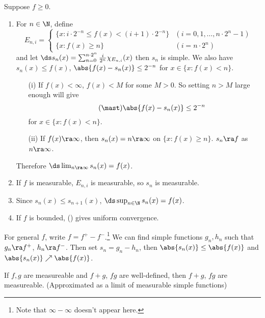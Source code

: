 \pf Suppose \(f \geq 0\).
\begin{enumerate}
    \item For \(n \in \N\), define
          \[
              E_{n, i} = \begin{cases}
                  \{x : i\cdot 2^{-n} \leq f(x) < (i+1)\cdot 2^{-n}\} & (i = 0, 1, \dots, n\cdot 2^n - 1) \\
                  \{x : f(x) \geq n\}                                 & (i = n\cdot 2^n)
              \end{cases}
          \]
          and let \(\ds s_n(x) = \sum_{n=0}^{n\cdot 2^n} \frac{i}{2^n} \chi_{E_{n, i}} (x)\) then \(s_n\) is simple. We also have \(s_n(x) \leq f(x)\), \(\abs{f(x) - s_n(x)} \leq 2^{-n}\) for \(x \in \{x : f(x) < n\}\).
          \begin{enumerate}
              \item[(i)] If \(f(x) < \infty\), \(f(x)< M\) for some \(M > 0\). So setting \(n > M\) large enough will give
                  \[ \tag{\mast}
                      \abs{f(x) - s_n(x)} \leq 2^{-n}
                  \]
                  for \(x \in \{x : f(x) < n\}\).
              \item[(ii)] If \(f(x) \ra\infty\), then \(s_n(x) = n \ra \infty\) on \(\{x : f(x) \geq n\}\). \(s_n \ra f\) as \(n \ra \infty\).
          \end{enumerate}
          Therefore \(\ds \lim_{n \ra \infty} s_n(x) = f(x)\).

    \item If \(f\) is measurable, \(E_{n, i}\) is measurable, so \(s_n\) is measurable.

    \item Since \(s_n(x) \leq s_{n+1}(x)\), \(\ds \sup_{n\in \N} s_n(x) = f(x)\).

    \item If \(f\) is bounded, (\mast) gives uniform convergence.
\end{enumerate}

For general \(f\), write \(f = f^+ - f^-\).\footnote{Note that \(\infty - \infty\) doesn't appear here.} We can find simple functions \(g_n, h_n\) such that \(g_n \ra f^+\), \(h_n \ra f^-\). Then set \(s_n = g_n - h_n\), then \(\abs{s_n(x)} \leq \abs{f(x)}\) and \(\abs{s_n(x)} \nearrow \abs{f(x)}\).

\cor If \(f, g\) are measureable and \(f + g\), \(fg\) are well-defined, then \(f+g\), \(fg\) are measureable. (Approximated as a limit of measurable simple functions)

\pagebreak
